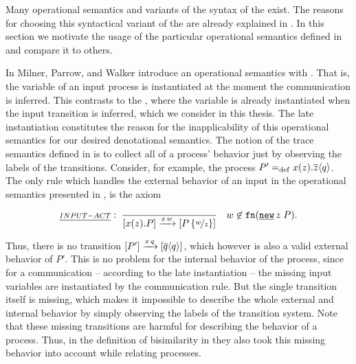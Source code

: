 Many operational semantics and variants of the syntax of the \picalc{} exist. %
The reasons for choosing this syntactical variant of the \picalc{} are already explained in . In this section we motivate the usage of the particular operational semantics defined in  and compare it to others.%

In \cite{milnerParrowWalker} Milner, Parrow, and Walker introduce an operational semantics with . That is, the variable of an input process is instantiated at the moment the communication is inferred. This contrasts to the , where the variable is already instantiated when the input transition is inferred, which we consider in this thesis. The late instantiation constitutes the reason for the inapplicability of this operational semantics for our desired denotational semantics. The notion of the trace semantics defined in  is to collect all of a process' behavior just by observing the labels of the transitions. Consider, for example, the process $P'=_{\mathrm{def}}x(z).\overline{z}\langle q\rangle$. The only rule which handles the external behavior of an input in the operational semantics presented in \cite{milnerParrowWalker}, is the axiom

\[\kalRule{INPUT-ACT}{}{}{\ec{\inp{x}{z}.P}\transs{\inpa{x}{w}}\ec{P\subs{w}{z}}}{\quad{}w\nin\fn{\procres{z}{P}}}.\]

Thus, there is no transition $\left[P'\right]\xrightarrow{x\,q}\left[\overline{q}\langle q\rangle\right]$, which however is also a valid external behavior of $P'$. This is no problem for the internal behavior of the process, since for a communication -- according to the late instantiation -- the missing input variables are instantiated by the communication rule. But the single transition itself is missing, which makes it impossible to describe the whole external and internal behavior by simply observing the labels of the transition system. Note that these missing transitions are harmful for describing the behavior of a process. Thus, in the definition of bisimilarity in \cite{milnerParrowWalker} they also took this missing behavior into account while relating processes.

